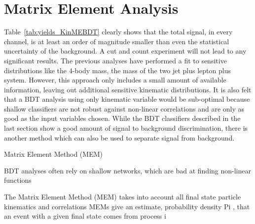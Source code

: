 \section{Matrix Element Analysis}

Table~\ref{tab:yields_KinMEBDT} clearly shows that the total signal, in every channel, is at least an order of magnitude smaller than even the statistical uncertainty of the background.
A cut and count experiment will not lead to any significant results.
The previous \HWWlnujj analyses have performed a fit to sensitive distributions like the 4-body mass, the mass of the two jet plus lepton plus \ETslash system.
However, this approach only includes a small amount of available information, leaving out additional sensitive kinematic distributions.
It is also felt that a BDT analysis using only kinematic variable would be sub-optimal because shallow classifiers are not robust against non-linear correlations and are only as good as the input variables chosen.
While the BDT classifiers described in the last section show a good amount of signal to background discrimination, there is another method which can also be used to separate signal from background.




Matrix Element Method (MEM)

BDT analyses often rely on shallow networks, which are bad at finding non-linear functions

The Matrix Element Method (MEM) takes into account all final state particle kinematics and correlations
MEMs give an estimate, probability density Pi , that an event with a given final state comes from process i

